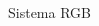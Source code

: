 \documentclass[]{beamer}
\begin{document}
\begin{frame}{Sistema RGB}
\begin{columns}
        \begin{column}{5cm}
\end{column}
\end{columns}
\end{frame}
\end{document}
